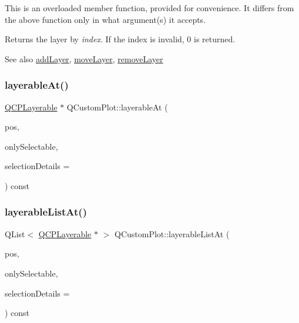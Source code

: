 This is an overloaded member function, provided for convenience. It differs from the above function only in what argument(s) it accepts.

Returns the layer by {\itshape index}. If the index is invalid, 0 is returned.

\begin{DoxySeeAlso}{See also}
\mbox{\hyperlink{class_q_custom_plot_ad5255393df078448bb6ac83fa5db5f52}{add\+Layer}}, \mbox{\hyperlink{class_q_custom_plot_ae896140beff19424e9e9e02d6e331104}{move\+Layer}}, \mbox{\hyperlink{class_q_custom_plot_a40f75e342c5eaab6a86066a42a0e2a94}{remove\+Layer}} 
\end{DoxySeeAlso}
\mbox{\label{class_q_custom_plot_a12536fa6d5deb34ec620acb5134ca82a}} 
\subsubsection{\texorpdfstring{layerableAt()}{layerableAt()}}
{\footnotesize\ttfamily \mbox{\hyperlink{class_q_c_p_layerable}{Q\+C\+P\+Layerable}} $\ast$ Q\+Custom\+Plot\+::layerable\+At (\begin{DoxyParamCaption}\item[{const Q\+PointF \&}]{pos,  }\item[{bool}]{only\+Selectable,  }\item[{Q\+Variant $\ast$}]{selection\+Details = {} }\end{DoxyParamCaption}) const\hspace{0.3cm}{\ttfamily [protected]}}

\mbox{\label{class_q_custom_plot_ac9048589e78e7959d27a2c48c253e159}} 
\subsubsection{\texorpdfstring{layerableListAt()}{layerableListAt()}}
{\footnotesize\ttfamily Q\+List$<$ \mbox{\hyperlink{class_q_c_p_layerable}{Q\+C\+P\+Layerable}} $\ast$ $>$ Q\+Custom\+Plot\+::layerable\+List\+At (\begin{DoxyParamCaption}\item[{const Q\+PointF \&}]{pos,  }\item[{bool}]{only\+Selectable,  }\item[{Q\+List$<$ Q\+Variant $>$ $\ast$}]{selection\+Details = {} }\end{DoxyParamCaption}) const\hspace{0.3cm}{\ttfamily [protected]}}

